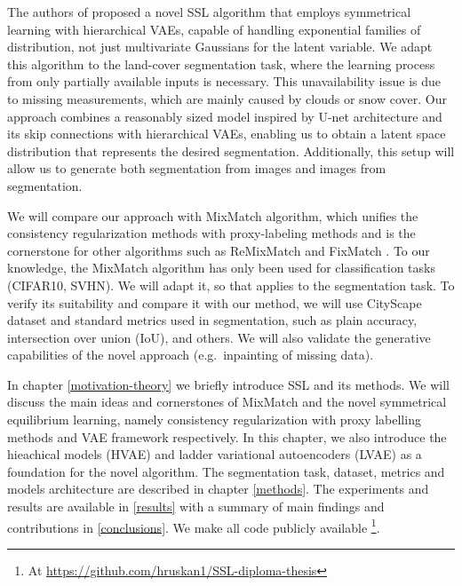 The authors of \cite{sym-learning-2023} proposed a novel SSL algorithm that employs symmetrical learning with hierarchical VAEs, capable of
handling exponential families of distribution, not just multivariate Gaussians for the latent variable. We adapt this algorithm to the 
land-cover segmentation task, where the learning process from only partially available inputs is necessary. This unavailability issue is
due to missing measurements, which are mainly caused by clouds or snow cover. Our approach combines a reasonably sized model inspired by 
U-net architecture and its skip connections\cite{unet-2015} with hierarchical VAEs, enabling us to obtain a latent space distribution that 
represents the desired segmentation. Additionally, this setup will allow us to generate both segmentation from images and images from segmentation.

We will compare our approach with MixMatch \cite{mixmatch-2019} algorithm, which unifies the consistency regularization methods with proxy-labeling
methods \cite{ssl-overview-2020} and is the cornerstone for other algorithms such as ReMixMatch \cite{remixmatch-2020} and FixMatch \cite{fixmatch-2020}.
To our knowledge, the MixMatch algorithm has only been used for classification tasks (CIFAR10, SVHN). We will adapt it, so that applies
to the segmentation task. To verify its suitability and compare it with our method, we will use CityScape dataset and standard metrics used in 
segmentation, such as plain accuracy, intersection over union (IoU), and others. We will also validate the generative capabilities of the novel approach 
(e.g.~inpainting of missing data).


In chapter \ref{motivation-theory} we briefly introduce SSL and its methods.  We will discuss the main ideas 
and cornerstones of MixMatch and the novel symmetrical equilibrium learning, namely consistency regularization with proxy 
labelling methods and VAE framework respectively. In this chapter, we also introduce the hieachical models (HVAE) and ladder
variational autoencoders (LVAE) as a foundation for the novel algorithm. The segmentation task, dataset, metrics and models architecture
are described in chapter \ref{methods}. The experiments and results are available in \ref{results} with a summary of main findings and 
contributions in \ref{conclusions}. We make all code publicly available \footnote[2]{At \url{https://github.com/hruskan1/SSL-diploma-thesis}}.


